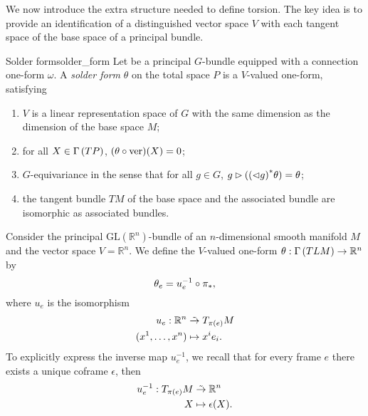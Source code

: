 We now introduce the extra structure needed to define torsion. The key idea is to provide an identification of a distinguished vector space \(V\) with each tangent space of the base space of a principal bundle.
\begin{definition}{Solder form}{solder_form}
    Let  be a principal \(G\)-bundle equipped with a connection one-form \(\omega\). A \emph{solder form} \(\theta\) on the total space \(P\) is a \(V\)-valued one-form, satisfying
    \begin{enumerate}[label=(\alph*)]
        \item \(V\) is a linear representation space of \(G\) with the same dimension as the dimension of the base space \(M\);
        \item for all \(X \in \Gamma\left(TP\right)\), \((\theta \circ \operatorname{ver})(X) = 0\);
        \item \(G\)-equivariance in the sense that for all \(g \in G\), \(g \mathbin{\vartriangleright} ({(\mathbin{\vartriangleleft} g)}^{\ast}_{}{\theta}) = \theta\);
        \item the tangent bundle \(TM\) of the base space and the associated bundle  are isomorphic as associated bundles.
    \end{enumerate}
\end{definition}
\begin{example}
    Consider the principal \(\mathrm{GL}(\mathbb{R}^n)\)-bundle  of an \(n\)-dimensional smooth manifold \(M\) and the vector space \(V = \mathbb{R}^n\). We define the \(V\)-valued one-form \(\theta : \Gamma\left(TLM\right) \to \mathbb{R}^n\) by
    \begin{equation*}
        \theta_e = u_e^{-1} \circ {\pi}_{\ast{}},
    \end{equation*}
    where \(u_e\) is the isomorphism
    \begin{align*}
        u_e : \mathbb{R}^n &\mathrel{\tilde{\to}} T_{\pi(e)}M\\
         (x^1, \dots, x^n) &\mapsto x^ie_i.
    \end{align*}
    To explicitly express the inverse map \(u_e^{-1}\), we recall that for every frame \(e\) there exists a unique coframe \(\epsilon\), then
    \begin{align*}
        u_e^{-1} : T_{\pi(e)}M &\mathrel{\tilde{\to}} \mathbb{R}^n\\
                             X &\mapsto \epsilon(X).
    \end{align*}
\end{example}

